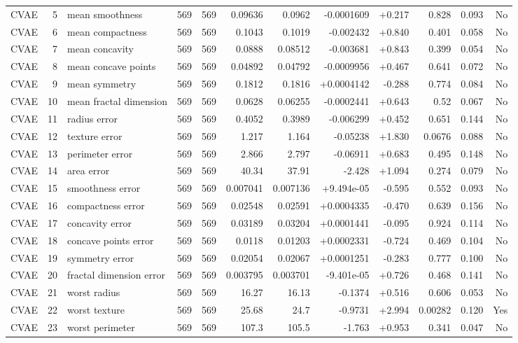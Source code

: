 \begin{landscape}
\begin{longtable}{@{}lrp{4.0cm}rrrrrrrrr@{}}
CVAE & 5 & mean smoothness & 569 & 569 & 0.09636 & 0.0962 & -0.0001609 & +0.217 & 0.828 & 0.093 & No \\
CVAE & 6 & mean compactness & 569 & 569 & 0.1043 & 0.1019 & -0.002432 & +0.840 & 0.401 & 0.058 & No \\
CVAE & 7 & mean concavity & 569 & 569 & 0.0888 & 0.08512 & -0.003681 & +0.843 & 0.399 & 0.054 & No \\
CVAE & 8 & mean concave points & 569 & 569 & 0.04892 & 0.04792 & -0.0009956 & +0.467 & 0.641 & 0.072 & No \\
CVAE & 9 & mean symmetry & 569 & 569 & 0.1812 & 0.1816 & +0.0004142 & -0.288 & 0.774 & 0.084 & No \\
CVAE & 10 & mean fractal dimension & 569 & 569 & 0.0628 & 0.06255 & -0.0002441 & +0.643 & 0.52 & 0.067 & No \\
CVAE & 11 & radius error & 569 & 569 & 0.4052 & 0.3989 & -0.006299 & +0.452 & 0.651 & 0.144 & No \\
CVAE & 12 & texture error & 569 & 569 & 1.217 & 1.164 & -0.05238 & +1.830 & 0.0676 & 0.088 & No \\
CVAE & 13 & perimeter error & 569 & 569 & 2.866 & 2.797 & -0.06911 & +0.683 & 0.495 & 0.148 & No \\
CVAE & 14 & area error & 569 & 569 & 40.34 & 37.91 & -2.428 & +1.094 & 0.274 & 0.079 & No \\
CVAE & 15 & smoothness error & 569 & 569 & 0.007041 & 0.007136 & +9.494e-05 & -0.595 & 0.552 & 0.093 & No \\
CVAE & 16 & compactness error & 569 & 569 & 0.02548 & 0.02591 & +0.0004335 & -0.470 & 0.639 & 0.156 & No \\
CVAE & 17 & concavity error & 569 & 569 & 0.03189 & 0.03204 & +0.0001441 & -0.095 & 0.924 & 0.114 & No \\
CVAE & 18 & concave points error & 569 & 569 & 0.0118 & 0.01203 & +0.0002331 & -0.724 & 0.469 & 0.104 & No \\
CVAE & 19 & symmetry error & 569 & 569 & 0.02054 & 0.02067 & +0.0001251 & -0.283 & 0.777 & 0.100 & No \\
CVAE & 20 & fractal dimension error & 569 & 569 & 0.003795 & 0.003701 & -9.401e-05 & +0.726 & 0.468 & 0.141 & No \\
CVAE & 21 & worst radius & 569 & 569 & 16.27 & 16.13 & -0.1374 & +0.516 & 0.606 & 0.053 & No \\
CVAE & 22 & worst texture & 569 & 569 & 25.68 & 24.7 & -0.9731 & +2.994 & 0.00282 & 0.120 & Yes \\
CVAE & 23 & worst perimeter & 569 & 569 & 107.3 & 105.5 & -1.763 & +0.953 & 0.341 & 0.047 & No \\

\end{longtable}
\end{landscape}
